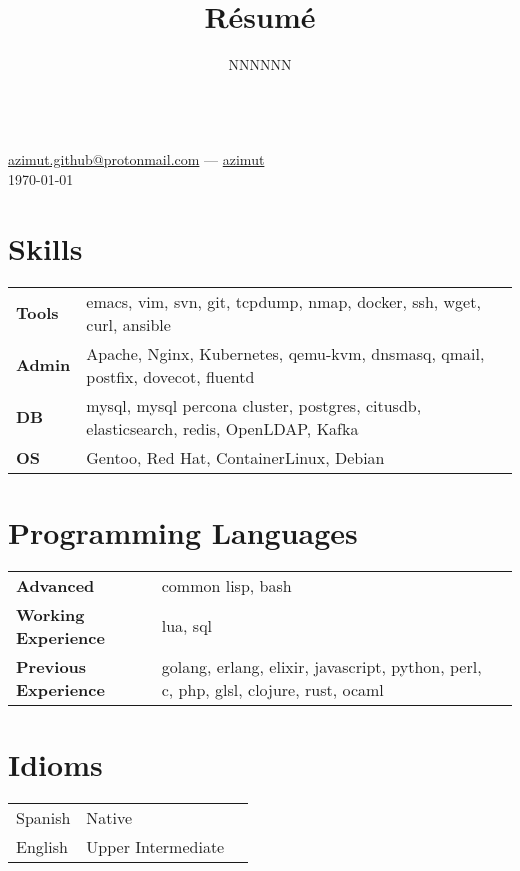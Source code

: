 \documentclass[11pt]{article}
\makeatletter
\renewcommand{\maketitle}{
  \begin{center}{\huge\bfseries\theauthor} \\
    \vspace{.25em}
    {\faEnvelope} \href {mailto:azimut.github@protonmail.com} {azimut.github@protonmail.com}
    ---
    {\faGithub} \href {https://github.com/azimut} {azimut} \\
    \vspace{.25em}
    \today
  \end{center}
}
\makeatother
\begin{document}
\title{R\'esum\'e}
\author{NNNNNN}
\maketitle


\section{Skills}


\begin{tabular}{@{}lll@{}}
  \hspace{.1em} \textbf{Tools} & emacs, vim, svn, git, tcpdump, nmap, docker, ssh, wget, curl, ansible \\
  \hspace{.1em} \textbf{Admin} & Apache, Nginx, Kubernetes, qemu-kvm, dnsmasq, qmail, postfix, dovecot, fluentd \\
  \hspace{.1em} \textbf{DB}    & mysql, mysql percona cluster, postgres, citusdb, elasticsearch, redis, OpenLDAP, Kafka \\
  \hspace{.1em} \textbf{OS}    & Gentoo, Red Hat, ContainerLinux, Debian \\
\end{tabular}


\section{Programming Languages}


\begin{tabular}{@{}lll@{}}
  \hspace{.1em} \textbf{Advanced}            & common lisp, bash \\
  \hspace{.1em} \textbf{Working Experience}  & lua, sql \\
  \hspace{.1em} \textbf{Previous Experience} & golang, erlang, elixir, javascript, python, perl, c, php, glsl, clojure, rust, ocaml \\
\end{tabular}


\section{Idioms}


\begin{tabular}{@{}lll@{}}
  \hspace{.1em} Spanish & Native \\
  \hspace{.1em} English & Upper Intermediate
  \\
\end{tabular}
\end{document}

